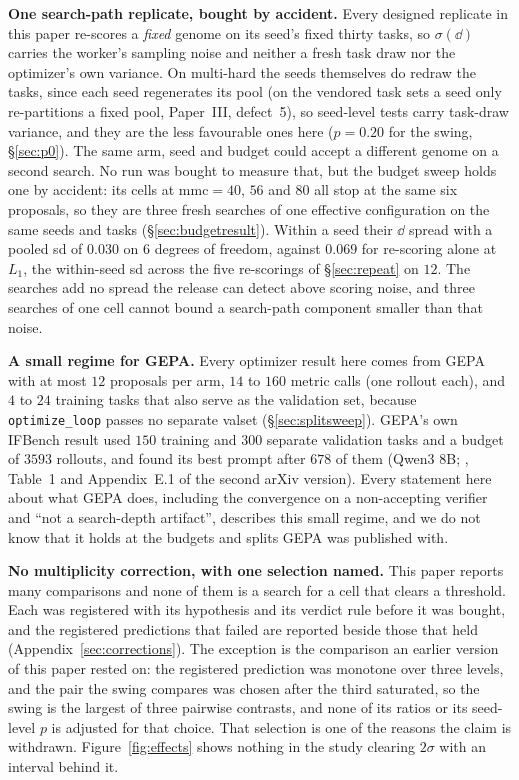 \documentclass[11pt]{article}
\begin{document}
\textbf{One search-path replicate, bought by accident.} Every designed replicate in this paper
re-scores a \emph{fixed} genome on its seed's fixed thirty tasks, so $\sigma(\dd)$ carries the
worker's sampling noise and neither a fresh task draw nor the optimizer's own variance. On
multi-hard the seeds themselves do redraw the tasks, since each seed regenerates its pool (on the
vendored task sets a seed only re-partitions a fixed pool, Paper~III, defect~5), so seed-level
tests carry task-draw variance, and they are the less favourable ones here ($p = 0.20$ for the
swing, \S\ref{sec:p0}). The same arm, seed and budget could accept a different genome on a second
search. No run was bought to measure that, but the budget sweep holds one by accident: its cells
at $\mathrm{mmc} = 40$, $56$ and $80$ all stop at the same six proposals, so they are three fresh
searches of one effective configuration on the same seeds and tasks (\S\ref{sec:budgetresult}).
Within a seed their $\dd$ spread with a pooled sd of $0.030$ on $6$ degrees of freedom, against
$0.069$ for re-scoring alone at $L_1$, the within-seed sd across the five re-scorings of
\S\ref{sec:repeat} on $12$. The searches add no spread the release can detect above scoring
noise, and three searches of one cell cannot bound a search-path component smaller than that
noise.

\textbf{A small regime for GEPA.} Every optimizer result here comes from GEPA with at most $12$
proposals per arm, $14$ to $160$ metric calls (one rollout each), and $4$ to $24$ training tasks
that also serve as the validation set, because \texttt{optimize\_loop} passes no separate valset
(\S\ref{sec:splitsweep}). GEPA's own IFBench result used $150$ training and $300$ separate
validation tasks and a budget of $3593$ rollouts, and found its best prompt after $678$ of them
(Qwen3 8B; \citealp{agrawal2025gepa}, Table~1 and Appendix~E.1 of the second arXiv version).
Every statement here about what GEPA does, including the convergence on a non-accepting verifier
and ``not a search-depth artifact'', describes this small regime, and we do not know that it holds
at the budgets and splits GEPA was published with.

\textbf{No multiplicity correction, with one selection named.} This paper reports many
comparisons and none of them is a search for a cell that clears a threshold. Each was registered
with its hypothesis and its verdict rule before it was bought, and the registered predictions
that failed are reported beside those that held (Appendix~\ref{sec:corrections}). The exception
is the comparison an earlier version of this paper rested on: the registered prediction was
monotone over three levels, and the pair the swing compares was chosen after the third saturated,
so the swing is the largest of three pairwise contrasts, and none of its ratios or its seed-level
$p$ is adjusted for that choice. That selection is one of the reasons the claim is withdrawn. Figure~\ref{fig:effects} shows nothing in the study clearing $2\sigma$ with
an interval behind it.
\end{document}
